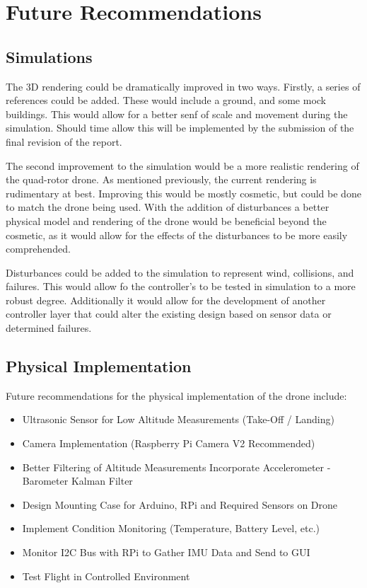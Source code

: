 \section{Future Recommendations}

\subsection{Simulations}
\label{recs:3d}
The 3D rendering could be dramatically improved in two ways.  Firstly, a series of references could be added.  These would include a ground, and some mock buildings.  This would allow for a better senf of scale and movement during the simulation.  Should time allow this will be implemented by the submission of the final revision of the report.

The second improvement to the simulation would be a more realistic rendering of the quad-rotor drone.  As mentioned previously, the current rendering is rudimentary at best.  Improving this would be mostly cosmetic, but could be done to match the drone being used.  With the addition of disturbances a better physical model and rendering of the drone would be beneficial beyond the cosmetic, as it would allow for the effects of the disturbances to be more easily comprehended.

Disturbances could be added to the simulation to represent wind, collisions, and failures.  This would allow fo the controller's to be tested in simulation to a more robust degree.  Additionally it would allow for the development of another controller layer that could alter the existing design based on sensor data or determined failures.


\subsection{Physical Implementation}

Future recommendations for the physical implementation of the drone include:

\begin{itemize}
\item Ultrasonic Sensor for Low Altitude Measurements (Take-Off / Landing)
\item Camera Implementation (Raspberry Pi Camera V2 Recommended)
\item Better Filtering of Altitude Measurements Incorporate Accelerometer - Barometer Kalman Filter
\item Design Mounting Case for Arduino, RPi and Required Sensors on Drone
\item Implement Condition Monitoring (Temperature, Battery Level, etc.)
\item Monitor I2C Bus with RPi to Gather IMU Data and Send to GUI
\item Test Flight in Controlled Environment
\end{itemize}


